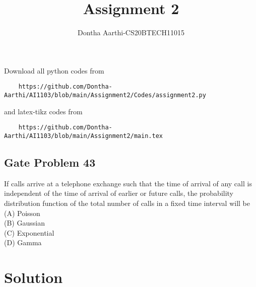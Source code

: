 \documentclass[journal,12pt,twocolumn]{IEEEtran}
\begin{document}
\vspace{3cm}
\title{Assignment 2}
\author{Dontha Aarthi-CS20BTECH11015}
\maketitle
\newpage
\bigskip
\renewcommand{\thefigure}{\theenumi}
\renewcommand{\thetable}{\theenumi}
Download all python codes from 
\begin{lstlisting}
    https://github.com/Dontha-Aarthi/AI1103/blob/main/Assignment2/Codes/assignment2.py
\end{lstlisting}
%
and latex-tikz codes from 
%
\begin{lstlisting}
    https://github.com/Dontha-Aarthi/AI1103/blob/main/Assignment2/main.tex
\end{lstlisting}
\begin{center}
  \section{\textbf{Gate Problem 43}} 
\end{center}
    If calls arrive at a telephone exchange such that
the time of arrival of any call is independent
of the time of arrival of earlier or future calls,
the probability distribution function of the total
number of calls in a fixed time interval will be\\
(A) Poisson\\
(B) Gaussian\\
(C) Exponential\\
(D) Gamma\\

\section{Solution}
\end{document}
